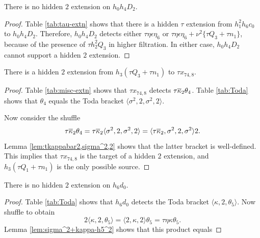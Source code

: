 \begin{lemma}
\label{lem:2-h0h4D2}
There is no hidden $2$ extension on $h_0 h_4 D_2$.
\end{lemma}

\begin{proof}
Table \ref{tab:tau-extn} shows that there is a hidden
$\tau$ extension from $h_1^2 h_6 c_0$ to $h_0 h_4 D_2$.
Therefore, $h_0 h_4 D_2$ detects either
$\tau \eta \epsilon \eta_6$ or
$\tau \eta \epsilon \eta_6 + \nu^2 \{\tau Q_3 + \tau n_1\}$,
because of the presence of $\tau h_2^2 Q_3$ in higher
filtration.
In either case, $h_0 h_4 D_2$ cannot support a hidden $2$ extension.
\end{proof}

\begin{lemma}
\label{lem:2-h3(tQ3+tn1)}
There is a hidden $2$ extension from $h_3(\tau Q_3+ \tau n_1)$
to $\tau x_{74,8}$.
\end{lemma}

\begin{proof}
Table \ref{tab:misc-extn} shows that
$\tau x_{74,8}$ detects $\tau \overline{\kappa}_2 \theta_4$.
Table \ref{tab:Toda} shows that $\theta_4$ equals
the Toda bracket $\langle \sigma^2, 2, \sigma^2, 2 \rangle$.

Now consider the shuffle
\[
\tau \overline{\kappa}_2 \theta_4 = 
\tau \overline{\kappa}_2 \langle \sigma^2, 2, \sigma^2, 2 \rangle =
\langle \tau \overline{\kappa}_2, \sigma^2, 2, \sigma^2 \rangle 2.
\]
Lemma \ref{lem:tkappabar2,sigma^2,2} shows that the latter
bracket is well-defined.
This implies that $\tau x_{74,8}$ is the target of a hidden $2$
extension, and $h_3(\tau Q_1 + \tau n_1)$ is the only possible
source.
\end{proof}


\begin{lemma}
\label{lem:2-h6d0}
There is no hidden $2$ extension on $h_6 d_0$.
\end{lemma}

\begin{proof}
Table \ref{tab:Toda} shows that $h_6 d_0$ detects the Toda bracket
$\langle \kappa, 2, \theta_5 \rangle$.  Now shuffle to obtain
\[
2 \langle \kappa, 2, \theta_5 \rangle = 
\langle 2, \kappa, 2 \rangle \theta_5 = \tau \eta \kappa \theta_5.
\]
Lemma \ref{lem:sigma^2+kappa-h5^2} shows that this product
equals 
\end{proof}

